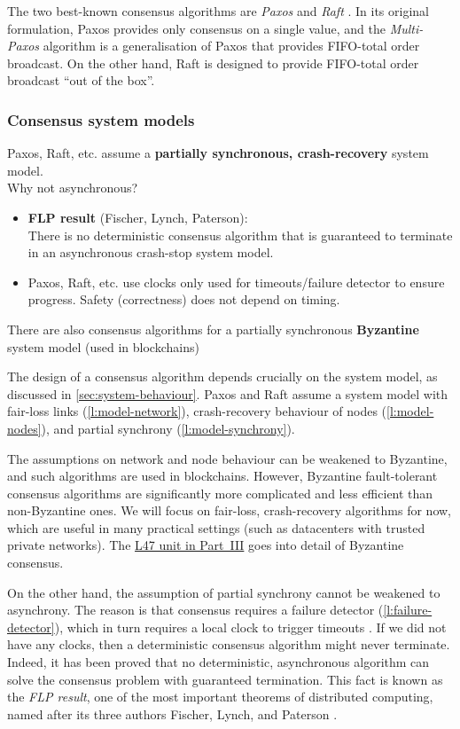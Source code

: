 The two best-known consensus algorithms are \emph{Paxos} \citep{Lamport:1998} and \emph{Raft} \citep{Ongaro:2014}.
In its original formulation, Paxos provides only consensus on a single value, and the \emph{Multi-Paxos} algorithm is a generalisation of Paxos that provides FIFO-total order broadcast.
On the other hand, Raft is designed to provide FIFO-total order broadcast ``out of the box''.

\begin{frame}
    \label{s:consensus-model}
    \frametitle{Consensus system models}
    Paxos, Raft, etc. assume a \textbf{partially synchronous, crash-recovery} system model.\\[1em]\pause
    Why not asynchronous?
    \begin{itemize}
        \item \textbf{FLP result} (Fischer, Lynch, Paterson):\\
            There is no deterministic consensus algorithm that is guaranteed to terminate in an asynchronous crash-stop system model.\pause
        \item Paxos, Raft, etc. use clocks only used for timeouts/failure detector to ensure progress.
            Safety (correctness) does not depend on timing.\\[1em]\pause
    \end{itemize}
    There are also consensus algorithms for a partially synchronous \textbf{Byzantine} system model (used in blockchains)
\end{frame}
\label{l:consensus-model}

The design of a consensus algorithm depends crucially on the system model, as discussed in \autoref{sec:system-behaviour}.
Paxos and Raft assume a system model with fair-loss links (\autoref{l:model-network}), crash-recovery behaviour of nodes (\autoref{l:model-nodes}), and partial synchrony (\autoref{l:model-synchrony}).

The assumptions on network and node behaviour can be weakened to Byzantine, and such algorithms are used in blockchains.
However, Byzantine fault-tolerant consensus algorithms are significantly more complicated and less efficient than non-Byzantine ones.
We will focus on fair-loss, crash-recovery algorithms for now, which are useful in many practical settings (such as datacenters with trusted private networks).
The \href{\ledgersystems}{L47 unit in Part~III} goes into detail of Byzantine consensus.

On the other hand, the assumption of partial synchrony cannot be weakened to asynchrony.
The reason is that consensus requires a failure detector (\autoref{l:failure-detector}), which in turn requires a local clock to trigger timeouts \citep{Chandra:1996}.
If we did not have any clocks, then a deterministic consensus algorithm might never terminate.
Indeed, it has been proved that no deterministic, asynchronous algorithm can solve the consensus problem with guaranteed termination.
This fact is known as the \emph{FLP result}, one of the most important theorems of distributed computing, named after its three authors Fischer, Lynch, and Paterson \citep{Fischer:1985}.

